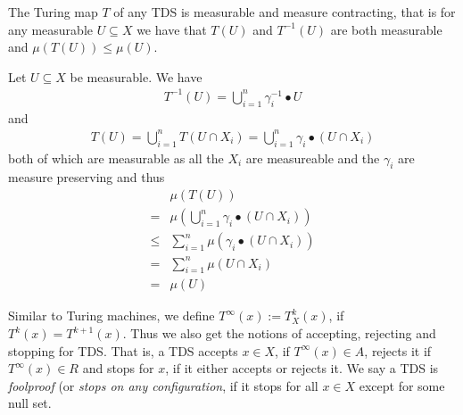 \begin{Lemma} \label{tds:lemma_tx_measurable:lemma}
	The Turing map $T$ of any TDS is measurable and measure contracting, that is for any measurable $U \subseteq X$ we have that $T(U)$ and $T^{-1}(U)$ are both measurable and $\mu(T(U)) \leq \mu(U)$.
\end{Lemma}
\proof
Let $U \subseteq X$ be measurable. We have
\begin{align*}
	T^{-1}(U) = \bigcup_{i=1}^n \gamma_i^{-1} \bullet U
\end{align*}
and
\begin{align*}
	T(U) = \bigcup_{i=1}^n T(U \cap X_i) = \bigcup_{i=1}^n \gamma_i \bullet (U \cap X_i)
\end{align*}
both of which are measurable as all the $X_i$ are measureable and the $\gamma_i$ are measure preserving and thus
\begin{align*}
	&\mu(T(U)) \\
	= &\mu(\bigcup_{i=1}^n \gamma_i \bullet (U \cap X_i)) \\
	\leq &\sum_{i=1}^n \mu(\gamma_i \bullet (U \cap X_i)) \\
	= &\sum_{i=1}^n \mu(U \cap X_i) \\
	= &\mu(U)
\end{align*}
\endproof

Similar to Turing machines, we define $T^\infty(x):=T_X^k(x)$, if $T^k(x)=T^{k+1}(x)$. Thus we also get the notions of accepting, rejecting and stopping for TDS.
That is, a TDS accepts $x \in X$, if $T^\infty(x) \in A$,
rejects it if $T^\infty(x) \in R$ 
and stops for $x$, if it either accepts or rejects it.
We say a TDS is \emph{foolproof} (or \emph{stops on any configuration}, if it stops for all $x \in X$ except for some null set.
